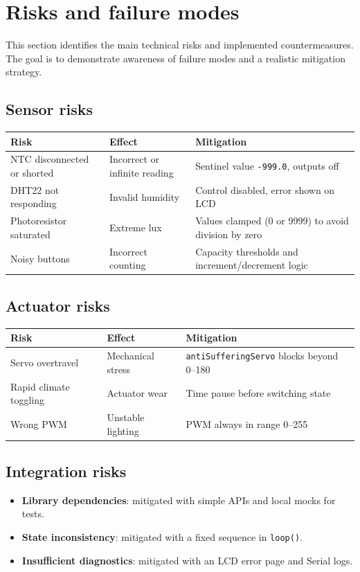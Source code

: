 \chapter{Risks and failure modes}

This section identifies the main technical risks and implemented countermeasures. The goal is to demonstrate awareness of failure modes and a realistic mitigation strategy.

\section{Sensor risks}
\small
\begin{longtable}{@{}>{\raggedright\arraybackslash}p{3.6cm}>{\raggedright\arraybackslash}p{6.2cm}>{\raggedright\arraybackslash}p{5.2cm}@{}}
\toprule
Risk & Effect & Mitigation \\
\midrule
NTC disconnected or shorted & Incorrect or infinite reading & Sentinel value \texttt{-999.0}, outputs off \\
DHT22 not responding & Invalid humidity & Control disabled, error shown on LCD \\
Photoresistor saturated & Extreme lux & Values clamped (0 or 9999) to avoid division by zero \\
Noisy buttons & Incorrect counting & Capacity thresholds and increment/decrement logic \\
\bottomrule
\end{longtable}
\normalsize

\section{Actuator risks}
\small
\begin{longtable}{@{}>{\raggedright\arraybackslash}p{3.6cm}>{\raggedright\arraybackslash}p{6.2cm}>{\raggedright\arraybackslash}p{5.2cm}@{}}
\toprule
Risk & Effect & Mitigation \\
\midrule
Servo overtravel & Mechanical stress & \texttt{antiSufferingServo} blocks beyond 0--180 \\
Rapid climate toggling & Actuator wear & Time pause before switching state \\
Wrong PWM & Unstable lighting & PWM always in range 0--255 \\
\bottomrule
\end{longtable}
\normalsize

\section{Integration risks}
\begin{itemize}
  \item \textbf{Library dependencies}: mitigated with simple APIs and local mocks for tests.
  \item \textbf{State inconsistency}: mitigated with a fixed sequence in \texttt{loop()}.
  \item \textbf{Insufficient diagnostics}: mitigated with an LCD error page and Serial logs.
\end{itemize}
